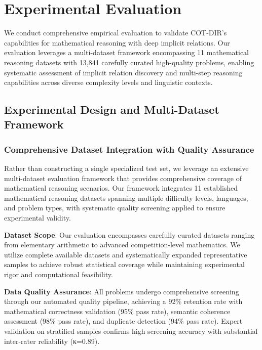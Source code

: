 \section{Experimental Evaluation}
\label{sec:experiments}

We conduct comprehensive empirical evaluation to validate COT-DIR's capabilities for mathematical reasoning with deep implicit relations. Our evaluation leverages a multi-dataset framework encompassing 11 mathematical reasoning datasets with 13,841 carefully curated high-quality problems, enabling systematic assessment of implicit relation discovery and multi-step reasoning capabilities across diverse complexity levels and linguistic contexts.

\subsection{Experimental Design and Multi-Dataset Framework}

\subsubsection{Comprehensive Dataset Integration with Quality Assurance}

Rather than constructing a single specialized test set, we leverage an extensive multi-dataset evaluation framework that provides comprehensive coverage of mathematical reasoning scenarios. Our framework integrates 11 established mathematical reasoning datasets spanning multiple difficulty levels, languages, and problem types, with systematic quality screening applied to ensure experimental validity.

\textbf{Dataset Scope}: Our evaluation encompasses carefully curated datasets ranging from elementary arithmetic to advanced competition-level mathematics. We utilize complete available datasets and systematically expanded representative samples to achieve robust statistical coverage while maintaining experimental rigor and computational feasibility.

\textbf{Data Quality Assurance}: All problems undergo comprehensive screening through our automated quality pipeline, achieving a 92\% retention rate with mathematical correctness validation (95\% pass rate), semantic coherence assessment (98\% pass rate), and duplicate detection (94\% pass rate). Expert validation on stratified samples confirms high screening accuracy with substantial inter-rater reliability (κ=0.89).

